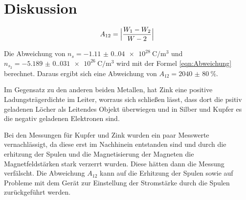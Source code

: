 \section{Diskussion}


\label{sec:Diskussion}
\begin{equation}
    A_{12}=\Bigl|\frac{W_1-W_2}{W-2}\Bigr|
    \label{eqn:Abweichung}
\end{equation}

Die Abweichung von $n_s=\qty{-1.11(0.04)e28}{\coulomb\per\cubic\meter}$ und $n_{s_2}=\qty{-5.189(0.031)e+26}{\coulomb\per\cubic\meter}$ wird mit der Formel \ref{eqn:Abweichung} berechnet.
Daraus ergibt sich eine Abweichung von $A_{12}=\qty{2040(80)}{\percent}$. 

Im Gegensatz zu den anderen beiden Metallen, hat Zink eine positive Ladungsträgerdichte im Leiter, worraus sich schließen lässt,
dass dort die psitiv geladenen Löcher als Leitendes Objekt überwiegen und in Silber und Kupfer es die negativ geladenen Elektronen sind.

Bei den Messungen für Kupfer und Zink wurden ein paar Messwerte vernachlässigt, da diese erst im Nachhinein entstanden sind
und durch die erhitzung der Spulen und die Magnetisierung der Magneten die Magnetfeldstärken stark verzerrt wurden. 
Diese hätten dann die Messung verfälscht.
Die Abweichung $A_{12}$ kann auf die Erhitzung der Spulen sowie auf Probleme mit dem Gerät zur Einstellung der Stromstärke durch die Spulen zurückgeführt werden.